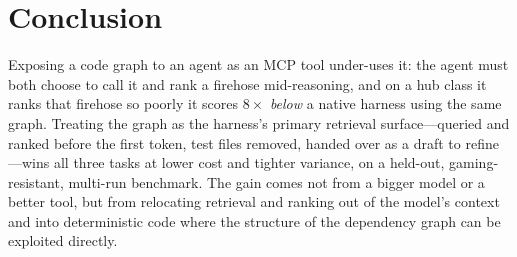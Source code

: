 \documentclass[11pt,twocolumn]{article}
\begin{document}
\section{Conclusion}
Exposing a code graph to an agent as an MCP tool under-uses it: the agent must both choose to call it
and rank a firehose mid-reasoning, and on a hub class it ranks that firehose so poorly it scores
$8\times$ \emph{below} a native harness using the same graph. Treating the graph as the harness's
primary retrieval surface---queried and ranked before the first token, test files removed, handed
over as a draft to refine---wins all three tasks at lower cost and tighter variance, on a held-out,
gaming-resistant, multi-run benchmark. The gain comes not from a bigger model or a better tool, but
from relocating retrieval and ranking out of the model's context and into deterministic code where
the structure of the dependency graph can be exploited directly.

\balance
\end{document}
